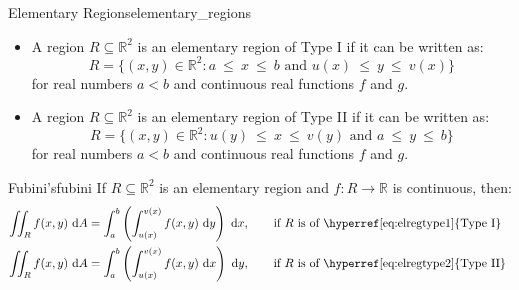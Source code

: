 \begin{adefinition}{Elementary Regions}{elementary_regions}
    \begin{itemize}
        \item A region $R\subseteq \mathbb{R}^2$ is an elementary region of Type I if it can be written as:
        \begin{equation*}
            \label{eq:elregtype1}
            R=\{(x,y) \in \mathbb{R}^2 : a~\leq~x~\leq~b \text{ and } u(x)~\leq~y~ \leq~v(x)\}
        \end{equation*}
        for real numbers $a < b$ and continuous real functions $f$ and $g$.
        \item A region $R\subseteq \mathbb{R}^2$ is an elementary region of Type II if it can be written as: 
        \begin{equation*}
            \label{eq:elregtype2}
            R=\{(x,y) \in \mathbb{R}^2 : u(y)~\leq~x~\leq~v(y) \text{ and } a~\leq~y~ \leq~b\}
        \end{equation*}
        for real numbers $a < b$ and continuous real functions $f$ and $g$.
    \end{itemize}
\end{adefinition}

\begin{atheorem}{Fubini's}{fubini}
    If $R \subseteq \mathbb{R}^2$ is an elementary region and $f: R \rightarrow \mathbb{R}$ is continuous, then:
    \begin{equation*}
        \begin{aligned}
            \iint_R f(x,y) \ \mathrm{d} A &= \int_{a}^{b} \left( \int_{u(x)}^{v(x)} f(x,y) \ \mathrm{d} y\right) \ \mathrm{d} x,  \qquad \text{if $R$ is of \hyperref[eq:elregtype1]{Type I}}\\
            \iint_R f(x,y) \ \mathrm{d} A &= \int_{a}^{b} \left( \int_{u(x)}^{v(x)} f(x,y) \ \mathrm{d} x\right) \ \mathrm{d} y,  \qquad \text{if $R$ is of \hyperref[eq:elregtype2]{Type II}}\
        \end{aligned}
    \end{equation*}
\end{atheorem}

\exercises

